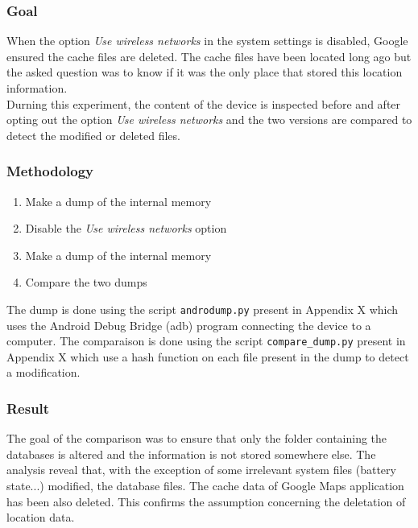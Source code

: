 \subsubsection{Goal}

When the option \emph{Use wireless networks} in the system settings is disabled, Google ensured the cache files are deleted.
The cache files have been located long ago but the asked question was to know if it was the only place that stored this location information.\\

Durning this experiment, the content of the device is inspected before and after opting out the option \emph{Use wireless networks} and the two versions are compared to detect the modified or deleted files.

\subsubsection{Methodology}

\begin{enumerate}
\item Make a dump of the internal memory
\item Disable the \emph{Use wireless networks} option
\item Make a dump of the internal memory
\item Compare the two dumps
\end{enumerate}

The dump is done using the script \texttt{androdump.py} present in Appendix X which uses the Android Debug Bridge (adb) program connecting the device to a computer.
The comparaison is done using the script \texttt{compare\_dump.py} present in Appendix X which use a hash function on each file present in the dump to detect a modification.

\subsubsection{Result}

The goal of the comparison was to ensure that only the folder containing the databases is altered and the information is not stored somewhere else.
The analysis reveal that, with the exception of some irrelevant system files (battery state...) modified, the database files.
The cache data of Google Maps application has been also deleted.
This confirms the assumption concerning the deletation of location data.\\

